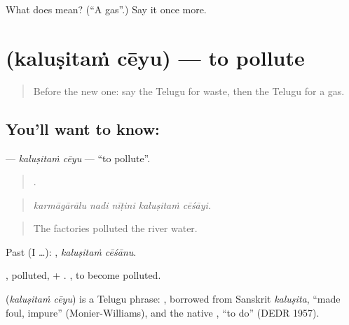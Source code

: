 \begin{tcolorbox}[breakable,colback=teal!4,colframe=teal!35!black,title={Before you move on}]
What does  mean? (\textquotedblleft{}A gas\textquotedblright{}.) Say it once more.
\end{tcolorbox}
\section[\texorpdfstring{\te{కలుషితం} \te{చేయు} (kaluṣitaṁ cēyu)}{కలుషితం చేయు (kaluṣitaṁ cēyu)}]{  (kaluṣitaṁ cēyu) — to pollute}

\label{lesson:TE-C470-kalusitam-ceyu}



\begin{quote}
Before the new one: say the Telugu for waste, then the Telugu for a gas.
\end{quote}

\subsection*{You'll want to know:  }
\textbf{ } — \emph{kaluṣitaṁ cēyu} — \textquotedblleft{}to pollute\textquotedblright{}.

\begin{quote}
    .
\end{quote}

\begin{quote}
\emph{karmāgārālu nadi nīṭini kaluṣitaṁ cēśāyi.}
\end{quote}

\begin{quote}
The factories polluted the river water.
\end{quote}

Past (I …):  , \emph{kaluṣitaṁ cēśānu}.

, polluted, + .  , to become polluted.

\begin{cousinweb}
\textbf{ } (\emph{kaluṣitaṁ cēyu}) is a Telugu phrase: , borrowed from Sanskrit \emph{kaluṣita}, \textquotedblleft{}made foul, impure\textquotedblright{} (Monier-Williams), and the native , \textquotedblleft{}to do\textquotedblright{} (DEDR 1957).
\end{cousinweb}

